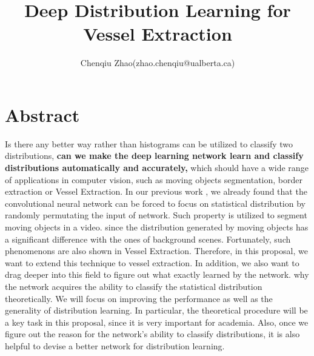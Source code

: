 \documentclass[UTF8]{article}
\title{ Deep Distribution Learning for Vessel Extraction}
\author{Chenqiu Zhao(zhao.chenqiu@ualberta.ca)}
\date{}
\begin{document}
\maketitle


\vspace{-30pt}


\section*{Abstract}
Is there any better way rather than histograms can be utilized to classify two distributions,
\textbf{can we make the deep learning network learn and classify distributions automatically and accurately,}
which should have a wide range of applications in computer vision, such as moving objects segmentation, border extraction or Vessel Extraction.
%
In our previous work \cite{2018_ICME_8486510},
we already found that the convolutional neural network can be forced to focus on statistical distribution
by randomly permutating the input of network.
%
Such property is utilized to segment moving objects in a video.
since the distribution generated by moving objects has a significant difference with the ones of background scenes.
%
Fortunately,
such phenomenons are also shown in Vessel Extraction.
%
Therefore,
in this proposal,
we want to extend this technique to vessel extraction.
In addition,
we also want to drag deeper into this field to figure out what exactly learned by the network.
%
why the network acquires the ability to classify the statistical distribution theoretically.
%
We will focus on improving the performance as well as the generality of distribution learning.
In particular,
the theoretical procedure will be a key task in this proposal,
since it is very important for academia.
%
Also,
once we figure out the reason for the network's ability to classify distributions,
it is also helpful to devise a better network for distribution learning.

\vspace{-10pt}
\end{document}
